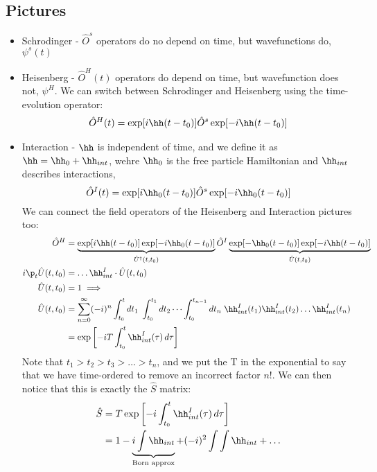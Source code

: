 \documentclass[a4paper, 11pt, normalem]{report}
\begin{document}
\chapter{}
\section{Pictures}
\begin{itemize}
    \item Schrodinger - $\hat{O}^{s}$ operators do no depend on time, but wavefunctions do, $\psi^s(t)$
    \item Heisenberg - $\hat{O}^H(t)$ operators do depend on time, but wavefunction does not, $\psi^H$.
        We can switch between Schrodinger and Heisenberg using the time-evolution operator: 
        \begin{align}
            \hat{O}^H(t) &= \exp[i\hh(t-t_0)]\hat{O}^s\exp[-i\hh(t-t_0)] \\
        \end{align}
    \item Interaction - $\hh$ is independent of time, and we define it as $\hh = \hh_0 + \hh_{int}$, wehre $\hh_0$ is the free particle Hamiltonian and $\hh_{int}$ describes interactions,
        \begin{equation}
            \hat{O}^I(t) = \exp[i\hh_0(t-t_0)]\hat{O}^s\exp[-i\hh_0(t-t_0)]
        \end{equation}
        We can connect the field operators of the Heisenberg and Interaction pictures too:
        \begin{align}
            \hat{O}^H &= \underbrace{\exp[i\hh(t-t_0)]\exp[-i\hh_0(t-t_0)]}_{\hat{U}^\dagger(t,t_0)}\hat{O}^I\underbrace{\exp[-\hh_0(t-t_0)]\exp[-i\hh(t-t_0)]}_{\hat{U}(t,t_0)} \\
            i\p_t\hat{U}(t,t_0) &= \dots \hh_{int}^I\cdot\hat{U}(t,t_0) \\
            \hat{U}(t,t_0) &= 1 \implies \\
            \hat{U}(t,t_0) &= \sum_{n=0}^\infty (-i)^n \int_{t_0}^t dt_1\; \int_{t_0}^{t_1} dt_2\, \dots \int_{t_0}^{t_{n-1}}dt_n \; \hh_{int}^I(t_1)\hh_{int}^I(t_2)\dots\hh_{int}^I(t_n) \\
                           &= \exp\left[-iT \int_{t_0}^t \hh_{int}^I(\tau)\,d\tau\right]
        \end{align}
        Note that $t_1>t_2>t_3>\dots>t_n$, and we put the T in the exponential to say that we have time-ordered to remove an incorrect factor $n!$.
        We can then notice that this is exactly the $\hat{S}$ matrix: 
        \begin{align}
            \hat{S} &= T\exp\left[-i\int_{t_0}^t \hh_{int}^I(\tau)\,d\tau\right] \\
                    &= 1 - \underbrace{i\int \hh_{int}}_{\text{Born approx}} + (-i)^2 \int \int \hh_{int} + \dots
        \end{align}
\end{itemize}
\end{document}
